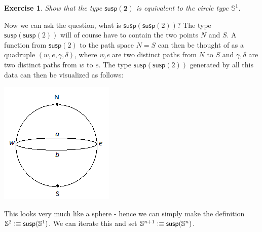\documentclass[11pt]{article}
\newcommand{\two}{\mathbf{2}}
\newcommand{\Sphere}[1]{\mathbb{S}^#1}
\newcommand{\susp}{\ensuremath{\mathsf{susp}}\xspace}
\newtheorem*{exercise}{Exercise}
\begin{document}
\begin{exercise}
Show that the type $\susp(\two)$ is equivalent to the circle type $\Sphere{1}$.
\end{exercise}

Now we can ask the question, what is $\susp(\susp(2))$? The type $\susp(\susp(2))$ will of course have to contain the two points $N$ and $S$. A function from $\susp(2)$ to the path space $N = S$ can then be thought of as a quadruple $(w, e, \gamma, \delta)$, where \emph{w,e} are two distinct paths from $N$ to $S$ and $\gamma,\delta$ are two distinct paths from $w$ to $e$. The type $\susp(\susp(2))$ generated by all this data can then be visualized as follows:

\begin{center}
\includegraphics[scale=0.5]{sphere}
\end{center}

This looks very much like a sphere - hence we can simply make the definition $\Sphere{2} \defeq \susp(\Sphere{1})$. We can iterate this and set $\Sphere{{n+1}} \defeq \susp(\Sphere{n})$.
\end{document}
